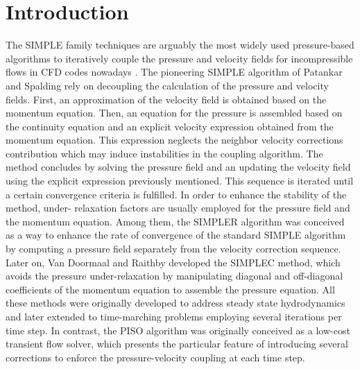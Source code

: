 \documentclass[final,3p,times,10pt,onecolumn]{myElsarticle}
\numberwithin{equation}{section}
\newcommand{\COM}[1]{{\color{green} #1}}
\begin{document}
\section{Introduction}


The SIMPLE family techniques 
\cite{patankar1972, patankar1981, vanDoormal, tao, tao2, cheng, issa} are arguably the most 
widely used pressure-based algorithms to iteratively couple the pressure and 
velocity fields for incompressible flows in CFD codes nowadays \cite{patankar1980,
moukalled,ferziger,versteeg,weller,fluent}. The pioneering SIMPLE algorithm of Patankar 
and Spalding \cite{patankar1972} rely on decoupling the calculation of the pressure and velocity fields. 
First, an approximation of the velocity field is obtained based on the momentum equation. Then, an equation 
for the pressure is assembled based on the continuity equation and an explicit velocity expression obtained 
from the momentum equation. This expression neglects the neighbor velocity corrections contribution which 
may induce instabilities in the coupling algorithm. The method concludes by solving the pressure field and an 
updating the velocity field using the explicit expression previously mentioned. This sequence is iterated 
until a certain convergence criteria is fulfilled. In order to enhance the stability of the method, under-
relaxation factors are usually employed for the pressure field and the momentum equation. Among them, the 
SIMPLER algorithm \cite{patankar1981} was conceived as a way to enhance the rate of convergence 
of the standard SIMPLE algorithm by computing a pressure field 
separately from the velocity correction sequence. Later on, 
Van Doormaal and Raithby \cite{vanDoormal} developed the SIMPLEC 
method, which avoids the pressure 
under-relaxation by manipulating diagonal and off-diagonal 
coefficients of the momentum equation to assemble 
the pressure equation. All these methods were originally 
developed to 
address steady state \COM{hydrodynamics} and later extended to 
time-marching problems employing several 
iterations per time step. In contrast, the PISO algorithm 
\cite{issa} was originally conceived as a low-cost transient 
flow solver, which presents 
the particular feature of introducing several corrections to 
\COM{enforce the pressure-velocity coupling at each time step.}
\end{document}
